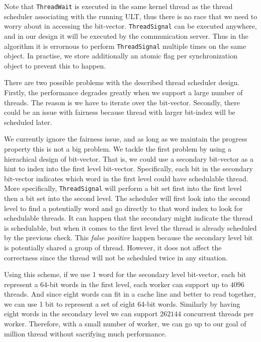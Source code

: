 \documentclass[11pt]{article}
\begin{document}
Note that \texttt{ThreadWait} is executed in the same kernel thread as the
thread scheduler associating with the running ULT, thus there is no race that
we need to worry about in accessing the bit-vector. \texttt{ThreadSignal} can
be executed anywhere, and in our design it will be executed by the
communication server. Thus in the algorithm it is errornous to perform
\texttt{ThreadSignal} multiple times on the same object. In practise, we store
additionally an atomic flag per synchronization object to prevent this to
happen.

There are two possible problems with the described thread scheduler design.
Firstly, the performance degrades greatly when we support a large number of
threads. The reason is we have to iterate over the bit-vector. Secondly, there
could be an issue with fairness because thread with larger bit-index will be
scheduled later.

We currently ignore the fairness issue, and as long as we maintain the progress
property this is not a big problem. We tackle the first problem by using a
hierachical design of bit-vector.  That is, we could use a secondary bit-vector
as a hint to index into the first level bit-vector.  Specifically, each bit in
the secondary bit-vector indicates which word in the first level could have
schedulable thread. More specifically, \texttt{ThreadSignal} will perform a bit
set first into the first level then a bit set into the second level. The
scheduler will first look into the second level to find a potentially word and
go directly to that word index to look for schedulable threads. It can happen
that the secondary might indicate the thread is schedulable, but when it comes
to the first level the thread is already scheduled by the previous check.  This
\textit{false positive} happen because the secondary level bit is potentially
shared a group of thread. However, it does not affect the correctness since the
thread will not be scheduled twice in any situation.

Using this scheme, if we use 1 word for the secondary level bit-vector, each
bit represent a 64-bit words in the first level, each worker can support up to
$4096$ threads. And since eight words can fit in a cache line and better to read
together, we can use 1 bit to represent a set of eight 64-bit words. Similarly by having
eight words in the secondary level we can support $262144$ concurrent threads per
worker. Therefore, with a small number of worker, we can go up to our goal of
million thread without sacrifying much performance.
\end{document}
